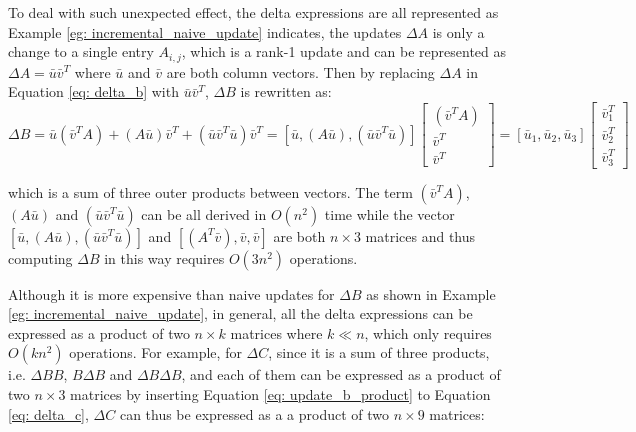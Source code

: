 To deal with such unexpected effect, the delta expressions are all represented as Example \ref{eg: incremental_naive_update} indicates, the updates $\Delta A$ is only a change to a single entry $A_{i,j}$, which is a rank-1 update and can be represented as $\Delta A = \bar{u}\bar{v}^T$ where $\bar{u}$ and $\bar{v}$ are both column vectors. Then by replacing $\Delta A$ in Equation \ref{eq: delta_b} with $\bar{u}\bar{v}^T$, $\Delta B$ is rewritten as:
\begin{equation}\label{eq: update_b_product}
\Delta B = \bar{u}(\bar{v}^TA) + (A\bar{u})\bar{v}^T + (\bar{u}\bar{v}^T\bar{u})\bar{v}^T=[\bar{u}, (A\bar{u}), (\bar{u}\bar{v}^T\bar{u})]
\begin{bmatrix}
    (\bar{v}^TA)  \\
    \bar{v}^T  \\
    \bar{v}^T   
\end{bmatrix}
=[\bar{u}_1, \bar{u}_2, \bar{u}_3]
\begin{bmatrix}
    \bar{v}^T_1  \\
    \bar{v}^T_2  \\
    \bar{v}^T_3  
\end{bmatrix}
\end{equation}

which is a sum of three outer products between vectors. The term $(\bar{v}^TA)$, $(A\bar{u})$ and $(\bar{u}\bar{v}^T\bar{u})$ can be all derived in $O(n^2)$ time while the vector $[\bar{u}, (A\bar{u}), (\bar{u}\bar{v}^T\bar{u})]$ and $[(A^T\bar{v}), \bar{v}, \bar{v}]$ are both $n \times 3$ matrices and thus computing $\Delta B$ in this way requires $O(3n^2)$ operations.

Although it is more expensive than naive updates for $\Delta B$ as shown in Example \ref{eg: incremental_naive_update}, in general, all the delta expressions can be expressed as a product of two $n \times k$ matrices where $k \ll n$, which only requires $O(kn^2)$ operations. For example, for $\Delta C$, since it is a sum of three products, i.e. $\Delta B B$, $B \Delta B$ and $\Delta B \Delta B$, and each of them can be expressed as a product of two $n \times 3$ matrices by inserting Equation \ref{eq: update_b_product} to Equation \ref{eq: delta_c}, $\Delta C$ can thus be expressed as a a product of two $n \times 9$ matrices:


